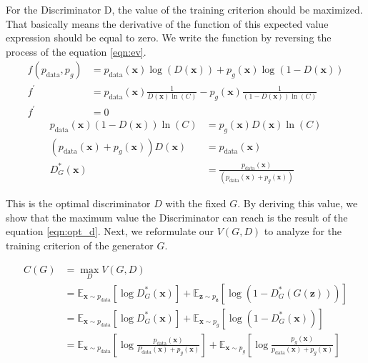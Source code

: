 For the Discriminator D, the value of the training criterion should be maximized. That basically means the
derivative of the function of this expected value expression should be equal to zero. We write the
function by reversing the process of the equation \ref{eqn:ev}.
\begin{align}
    f( p_{\text{data}}, p_g) &= p_{\text{data}}(\boldsymbol{x}) \log(D(\boldsymbol{x})) + p_g(\boldsymbol{x}) \log(1 - D(\boldsymbol{x})) \\[5pt]
    f^{\prime} &= p_{\text{data}}(\boldsymbol{x}) \frac{1}{D(\boldsymbol{x}) \ln(C)} - p_g(\boldsymbol{x}) \frac{1}{(1- D(\boldsymbol{x})) \ln(C)} \\[5pt]
    f^{\prime} &= 0
\end{align}
\begin{align}
    p_{\text{data}}(\boldsymbol{x}) (1- D(\boldsymbol{x})) \ln(C) &= p_g(\boldsymbol{x}) D(\boldsymbol{x}) \ln(C)\\[5pt]
    (p_{\text{data}}(\boldsymbol{x}) +  p_g(\boldsymbol{x})) D(\boldsymbol{x}) &= p_{\text{data}}(\boldsymbol{x})\\[5pt]
    D^{*}_G(\boldsymbol{x}) &= \frac{p_{\text{data}}(\boldsymbol{x})}{(p_{\text{data}}(\boldsymbol{x}) +  p_g(\boldsymbol{x}))}\label{eqn:opt_d}
\end{align}

This is the optimal discriminator $D$ with the fixed $G$. By deriving this value, we show that the
maximum value the Discriminator can reach is the result of the equation \ref{eqn:opt_d}. Next, we reformulate our
$V(G, D)$ to analyze for the training criterion of the generator $G$. 

\begin{align}
    C(G) &= \max _{D} V(G, D) \\[5pt]
    & =\mathbb{E}_{\boldsymbol{x} \sim p_{\mathrm{data}}}\left[\log D_{G}^{*}(\boldsymbol{x})\right]+\mathbb{E}_{\boldsymbol{z} \sim p_{\boldsymbol{z}}}\left[\log \left(1-D_{G}^{*}(G(\boldsymbol{z}))\right)\right] \\[5pt]
    & =\mathbb{E}_{\boldsymbol{x} \sim p_{\mathrm{data}}}\left[\log D_{G}^{*}(\boldsymbol{x})\right]+\mathbb{E}_{\boldsymbol{x} \sim p_{g}}\left[\log \left(1-D_{G}^{*}(\boldsymbol{x})\right)\right] \\[5pt]
    & =\mathbb{E}_{\boldsymbol{x} \sim p_{\mathrm{data}}}\left[\log \frac{p_{\mathrm{data}}(\boldsymbol{x})}{P_{\mathrm{data}}(\boldsymbol{x})+p_{g}(\boldsymbol{x})}\right]+\mathbb{E}_{\boldsymbol{x} \sim p_{g}}\left[\log \frac{p_{g}(\boldsymbol{x})}{p_{\mathrm{data}}(\boldsymbol{x})+p_{g}(\boldsymbol{x})}\right] 
\end{align}

